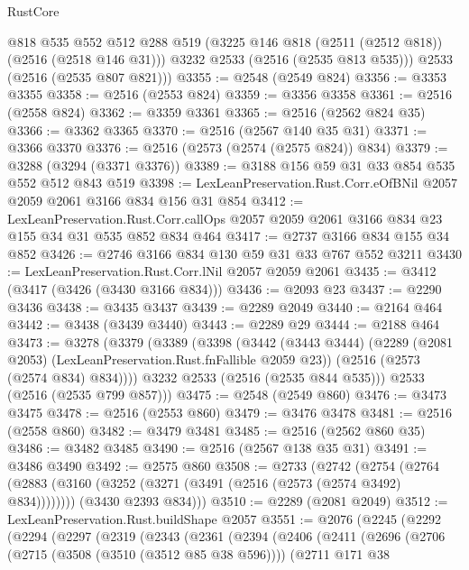 \begin{lexlean}{RustCore}
\begin{coremodule}
        @818
        @535
        @552
        @512
        @288
        @519
        (@3225 @146 @818 (@2511 (@2512 @818)) (@2516 (@2518 @146 @31)))
        @3232
        @2533
        (@2516 (@2535 @813 @535)))
      @2533
      (@2516 (@2535 @807 @821)))
@3355 := @2548 (@2549 @824)
@3356 := @3353 @3355
@3358 := @2516 (@2553 @824)
@3359 := @3356 @3358
@3361 := @2516 (@2558 @824)
@3362 := @3359 @3361
@3365 := @2516 (@2562 @824 @35)
@3366 := @3362 @3365
@3370 := @2516 (@2567 @140 @35 @31)
@3371 := @3366 @3370
@3376 := @2516 (@2573 (@2574 (@2575 @824)) @834)
@3379 := @3288 (@3294 (@3371 @3376))
@3389 := @3188 @156 @59 @31 @33 @854 @535 @552 @512 @843 @519
@3398 := LexLeanPreservation.Rust.Corr.eOfBNil @2057 @2059 @2061 @3166 @834 @156 @31 @854
@3412 := LexLeanPreservation.Rust.Corr.callOps
    @2057
    @2059
    @2061
    @3166
    @834
    @23
    @155
    @34
    @31
    @535
    @852
    @834
    @464
@3417 := @2737 @3166 @834 @155 @34 @852
@3426 := @2746 @3166 @834 @130 @59 @31 @33 @767 @552 @3211
@3430 := LexLeanPreservation.Rust.Corr.lNil @2057 @2059 @2061
@3435 := @3412 (@3417 (@3426 (@3430 @3166 @834)))
@3436 := @2093 @23
@3437 := @2290 @3436
@3438 := @3435 @3437
@3439 := @2289 @2049
@3440 := @2164 @464
@3442 := @3438 (@3439 @3440)
@3443 := @2289 @29
@3444 := @2188 @464
@3473 := @3278
    (@3379
      (@3389
        (@3398
          (@3442
            (@3443 @3444)
            (@2289 (@2081 @2053) (LexLeanPreservation.Rust.fnFallible @2059 @23))
            (@2516 (@2573 (@2574 @834) @834))))
        @3232
        @2533
        (@2516 (@2535 @844 @535)))
      @2533
      (@2516 (@2535 @799 @857)))
@3475 := @2548 (@2549 @860)
@3476 := @3473 @3475
@3478 := @2516 (@2553 @860)
@3479 := @3476 @3478
@3481 := @2516 (@2558 @860)
@3482 := @3479 @3481
@3485 := @2516 (@2562 @860 @35)
@3486 := @3482 @3485
@3490 := @2516 (@2567 @138 @35 @31)
@3491 := @3486 @3490
@3492 := @2575 @860
@3508 := @2733
    (@2742
      (@2754
        (@2764 (@2883 (@3160 (@3252 (@3271 (@3491 (@2516 (@2573 (@2574 @3492) @834))))))))
        (@3430 @2393 @834)))
@3510 := @2289 (@2081 @2049)
@3512 := LexLeanPreservation.Rust.buildShape @2057
@3551 := @2076
    (@2245
      (@2292
        (@2294
          (@2297
            (@2319
              (@2343
                (@2361
                  (@2394
                    (@2406
                      (@2411
                        (@2696
                          (@2706
                            (@2715 (@3508 (@3510 (@3512 @85 @38 @596))))
                            (@2711
                              @171
                              @38

\end{coremodule}
\end{lexlean}
